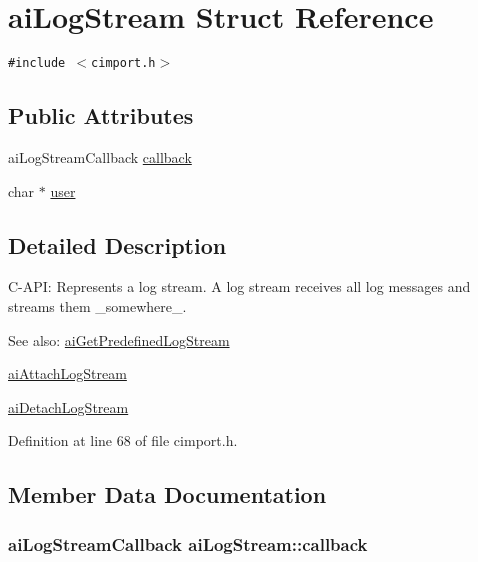 \hypertarget{structai_log_stream}{
\section{aiLogStream Struct Reference}
\label{structai_log_stream}
}
{\tt \#include $<$cimport.h$>$}

\subsection*{Public Attributes}
\begin{CompactItemize}
\item 
aiLogStreamCallback \hyperlink{structai_log_stream_c73ae46eee54ba0f920d6abb97c33e97}{callback}
\item 
char $\ast$ \hyperlink{structai_log_stream_3382042e4171a6dd5a71d7f98741f86e}{user}
\end{CompactItemize}


\subsection{Detailed Description}
C-API: Represents a log stream. A log stream receives all log messages and streams them \_\-somewhere\_\-. \begin{Desc}
\item[See also:]\hyperlink{cimport_8h_d7e375d7b134ec590e812ad1f50eab94}{aiGetPredefinedLogStream} 

\hyperlink{cimport_8h_75c5aa6027cb059e63b3dda005c9c149}{aiAttachLogStream} 

\hyperlink{cimport_8h_98ad05bb95e8f8157a97c133812a1597}{aiDetachLogStream} \end{Desc}


Definition at line 68 of file cimport.h.

\subsection{Member Data Documentation}
\hypertarget{structai_log_stream_c73ae46eee54ba0f920d6abb97c33e97}{
\subsubsection[callback]{\setlength{\rightskip}{0pt plus 5cm}aiLogStreamCallback {\bf aiLogStream::callback}}}
\label{structai_log_stream_c73ae46eee54ba0f920d6abb97c33e97}


